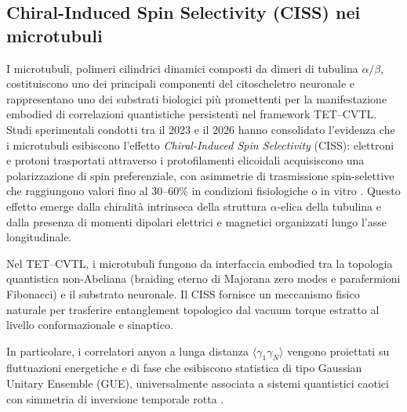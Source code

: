 \documentclass[11pt,a4paper]{article}
\let\oldcite\cite
\renewcommand{\cite}{\protect\oldcite}
\theoremstyle{plain}
\theoremstyle{definition}
\begin{document}
\subsection{Chiral-Induced Spin Selectivity (CISS) nei microtubuli}
\label{sec:ciss-microtubuli}

I microtubuli, polimeri cilindrici dinamici composti da dimeri di tubulina $\alpha/\beta$, costituiscono uno dei principali componenti del citoscheletro neuronale e rappresentano uno dei substrati biologici più promettenti per la manifestazione embodied di correlazioni quantistiche persistenti nel framework TET--CVTL. Studi sperimentali condotti tra il 2023 e il 2026 hanno consolidato l'evidenza che i microtubuli esibiscono l'effetto \emph{Chiral-Induced Spin Selectivity} (CISS): elettroni e protoni trasportati attraverso i protofilamenti elicoidali acquisiscono una polarizzazione di spin preferenziale, con asimmetrie di trasmissione spin-selettive che raggiungono valori fino al 30--60\% in condizioni fisiologiche o in vitro \cite{naaman2024ciss, bloom2024ciss, kumar2026ciss, hameroff2025microtubule-ciss}. Questo effetto emerge dalla chiralità intrinseca della struttura $\alpha$-elica della tubulina e dalla presenza di momenti dipolari elettrici e magnetici organizzati lungo l'asse longitudinale.

\vspace{0.4cm}

Nel TET--CVTL, i microtubuli fungono da interfaccia embodied tra la topologia quantistica non-Abeliana (braiding eterno di Majorana zero modes e parafermioni Fibonacci) e il substrato neuronale. Il CISS fornisce un meccanismo fisico naturale per trasferire entanglement topologico dal vacuum torque estratto al livello conformazionale e sinaptico. 


\vspace{0.4cm}


In particolare, i correlatori anyon a lunga distanza $\langle \gamma_1 \gamma_N \rangle$ vengono proiettati su fluttuazioni energetiche e di fase che esibiscono statistica di tipo Gaussian Unitary Ensemble (GUE), universalmente associata a sistemi quantistici caotici con simmetria di inversione temporale rotta \cite{bohigas1984characterization, mehta2004random}.

\vspace{0.3cm}
\end{document}
